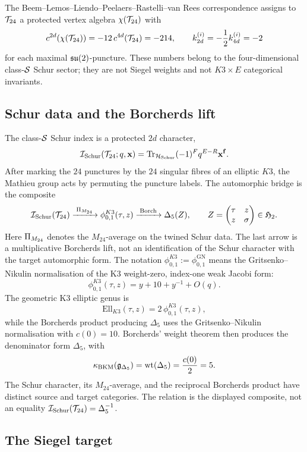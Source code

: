 The Beem--Lemos--Liendo--Peelaers--Rastelli--van Rees correspondence
assigns to \(\mathcal{T}_{24}\) a protected vertex algebra
\(\chi(\mathcal{T}_{24})\) with
\[
  c^{2d}(\chi(\mathcal{T}_{24}))
  =
  -12\,c^{4d}(\mathcal{T}_{24})
  =
  -214,
  \qquad
  k_{2d}^{(i)}
  =
  -\frac{1}{2}k_{4d}^{(i)}
  =
  -2
\]
for each maximal \(\mathfrak{su}(2)\)-puncture.  These numbers belong to the
four-dimensional class-\(\mathcal{S}\) Schur sector; they are not Siegel weights
and not \(K3\times E\) categorical invariants.

\subsection*{Schur data and the Borcherds lift}

The class-\(\mathcal{S}\) Schur index is a protected \(2d\) character,
\[
  \mathcal{I}_{\mathrm{Schur}}(\mathcal{T}_{24};q,\mathbf{x})
  =
  \mathrm{Tr}_{\mathcal H_{\mathrm{Schur}}}
  (-1)^F q^{E-R}\mathbf{x}^{\mathbf f}.
\]
After marking the \(24\) punctures by the \(24\) singular fibres of an
elliptic \(K3\), the Mathieu group acts by permuting the puncture labels.
The automorphic bridge is the composite
\[
  \mathcal{I}_{\mathrm{Schur}}(\mathcal{T}_{24})
  \xrightarrow{\;\Pi_{M_{24}}\;}
  \phi_{0,1}^{K3}(\tau,z)
  \xrightarrow{\;\mathrm{Borch}\;}
  \Delta_5(Z),
  \qquad
  Z=\begin{pmatrix}\tau&z\\ z&\sigma\end{pmatrix}\in\mathfrak H_2.
\]
Here \(\Pi_{M_{24}}\) denotes the \(M_{24}\)-average on the twined Schur
data.  The last arrow is a multiplicative Borcherds lift, not an
identification of the Schur character with the target automorphic form.
The notation
\(\phi_{0,1}^{K3}:=\phi_{0,1}^{\mathrm{GN}}\) means the
Gritsenko--Nikulin normalisation of the K3 weight-zero, index-one weak
Jacobi form:
\[
  \phi_{0,1}^{K3}(\tau,z)
  =
  y+10+y^{-1}+O(q).
\]
The geometric K3 elliptic genus is
\[
  \mathrm{Ell}_{K3}(\tau,z)=2\,\phi_{0,1}^{K3}(\tau,z),
\]
while the Borcherds product producing \(\Delta_5\) uses the
Gritsenko--Nikulin normalisation with \(c(0)=10\).  Borcherds' weight
theorem then produces the denominator form \(\Delta_5\), with
\[
  \kappa_{\mathrm{BKM}}(\mathfrak g_{\Delta_5})
  =
  \mathrm{wt}(\Delta_5)
  =
  \frac{c(0)}{2}
  =
  5.
\]
The Schur character, its \(M_{24}\)-average, and the reciprocal
Borcherds product have distinct source and target categories.  The
relation is the displayed composite, not an equality
\(\mathcal{I}_{\mathrm{Schur}}(\mathcal{T}_{24})=\Delta_5^{-1}\).

\subsection*{The Siegel target}

